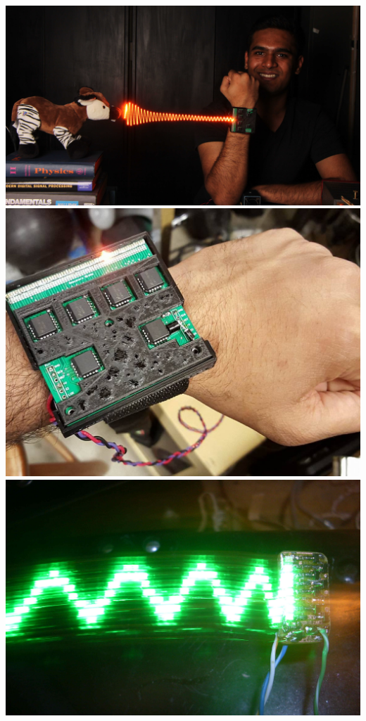\documentclass{sigchi-ext}
\begin{document}
\begin{marginfigure}[-23pc]
  \begin{minipage}{\marginparwidth}
 \includegraphics[width=\textwidth]{sarangs.jpg}\\
 \includegraphics[width=\textwidth]{microswims.jpg}\\
 \includegraphics[width=\textwidth]{SDC11632s.jpg}\\

\end{minipage}
\end{marginfigure}
\end{document}
